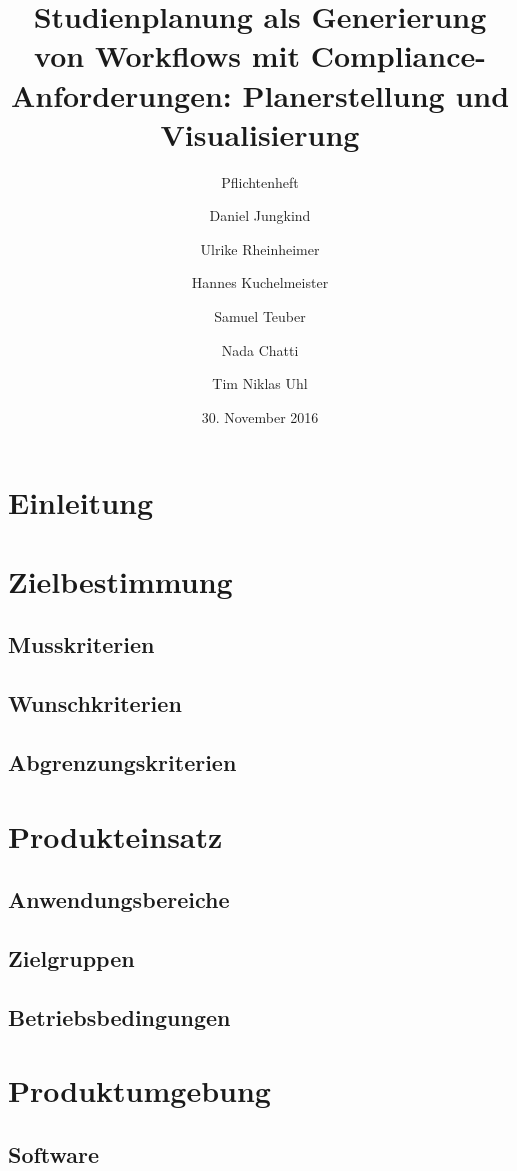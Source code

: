 \documentclass[titlepage=true, parskip=full]{scrartcl}
\title{Studienplanung als Generierung von Workflows mit Compliance-Anforderungen: Planerstellung und Visualisierung}
\subtitle{Pflichtenheft}
\author{Daniel Jungkind \and Ulrike Rheinheimer \and Hannes Kuchelmeister \and Samuel Teuber \and Nada Chatti \and Tim Niklas Uhl}
\date{30. November 2016}
\begin{document}
\maketitle
\tableofcontents
\pagebreak

%
\section{Einleitung}

\section{Zielbestimmung}

\subsection{Musskriterien}

\subsection{Wunschkriterien}

\subsection{Abgrenzungskriterien}

\section{Produkteinsatz}

\subsection{Anwendungsbereiche}

\subsection{Zielgruppen}

\subsection{Betriebsbedingungen}

\section{Produktumgebung}

\subsection{Software}
\end{document}
